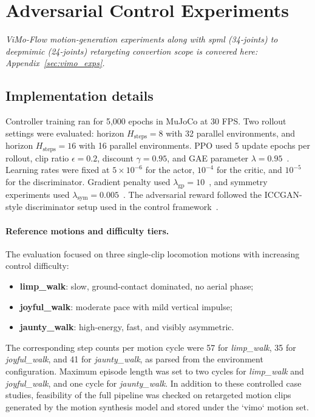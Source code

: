 \section{Adversarial Control Experiments}
\label{sec:phys_exps}

\noindent\textit{ViMo-Flow motion-generation experiments along with spml (34-joints) to deepmimic (24-joints) retargeting convertion scope is convered here: Appendix~\ref{sec:vimo_exps}.}\par

\subsection{Implementation details}
Controller training ran for 5,000 epochs in MuJoCo at 30 FPS. Two rollout settings were evaluated: horizon $H_{\text{steps}}=8$ with 32 parallel environments, and horizon $H_{\text{steps}}=16$ with 16 parallel environments. PPO used 5 update epochs per rollout, clip ratio $\epsilon=0.2$, discount $\gamma=0.95$, and GAE parameter $\lambda=0.95$~\cite{ppo2017}. Learning rates were fixed at $5\times 10^{-6}$ for the actor, $10^{-4}$ for the critic, and $10^{-5}$ for the discriminator. Gradient penalty used $\lambda_{\text{gp}}=10$~\cite{wgangp2017}, and symmetry experiments used $\lambda_{\text{sym}}=0.005$~\cite{symlocom2018}. The adversarial reward followed the ICCGAN-style discriminator setup used in the control framework~\cite{iccgan2021, composite2023}.

\paragraph{Reference motions and difficulty tiers.}
The evaluation focused on three single-clip locomotion motions with increasing control difficulty:
\begin{itemize}
    \item \textbf{limp\_walk}: slow, ground-contact dominated, no aerial phase;
    \item \textbf{joyful\_walk}: moderate pace with mild vertical impulse;
    \item \textbf{jaunty\_walk}: high-energy, fast, and visibly asymmetric.
\end{itemize}
The corresponding step counts per motion cycle were 57 for \textit{limp\_walk}, 35 for \textit{joyful\_walk}, and 41 for \textit{jaunty\_walk}, as parsed from the environment configuration. Maximum episode length was set to two cycles for \textit{limp\_walk} and \textit{joyful\_walk}, and one cycle for \textit{jaunty\_walk}. In addition to these controlled case studies, feasibility of the full pipeline was checked on retargeted motion clips generated by the motion synthesis model and stored under the `vimo` motion set.


